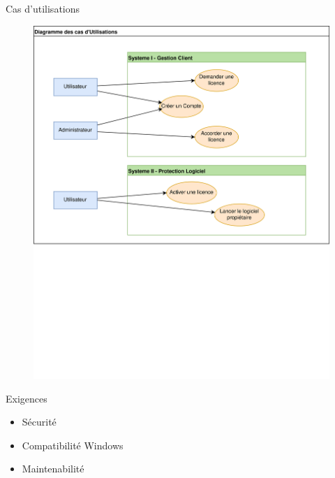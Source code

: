 \documentclass{cubeamer}
\begin{document}
\begin{frame}{Cas d'utilisations}
    \begin{figure}
        \centering
        \includegraphics[scale=0.5]{img/Util.png}
    \end{figure}
\end{frame}

\begin{frame}{Exigences}
    \begin{itemize}
        \item Sécurité
        \medskip
        \item Compatibilité Windows
        \medskip
        \item Maintenabilité
    \end{itemize}
\end{frame}
\end{document}
